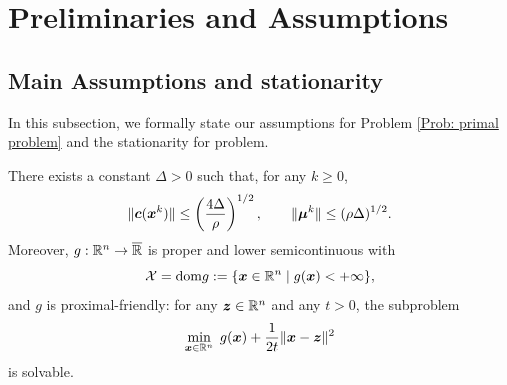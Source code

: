 \documentclass[10pt]{article}
\begin{document}
\section{Preliminaries and Assumptions}
\label{sec:prelim}

\subsection{Main Assumptions and stationarity}
\label{Subsection: main assumptions}
In this subsection, we formally state our assumptions for Problem \eqref{Prob: primal problem} and the stationarity for problem.

\begin{assumption}
    \label{ass:the-meaning-of-the-problem}
    There exists a constant $\Delta>0$ such that, for any $k\ge 0$,
    \[
    \|\bm{c}(\bm{x}^k)\| \leq \left(\frac{4\Delta}{\rho}\right)^{1/2},
    \qquad
    \|\bm{\mu}^k\| \leq (\rho\Delta)^{1/2}.
    \]
    Moreover, $g:\mathbb{R}^n\to\overline{\mathbb{R}}$ is proper and lower semicontinuous with
    \[
    \mathcal{X} = \mathrm{dom} g := \{\bm{x}\in \mathbb{R}^n \mid g(\bm{x}) < +\infty\},
    \]
    and $g$ is proximal-friendly: for any $\bm{z}\in\mathbb{R}^n$ and any $t>0$, the subproblem
    \begin{equation}\label{eq:prox-oracle-g}
        \min_{\bm{x}\in \mathbb{R}^{n}} \; g(\bm{x}) + \frac{1}{2t}\|\bm{x}-\bm{z}\|^2
    \end{equation}
    is solvable.
\end{assumption}
\end{document}
